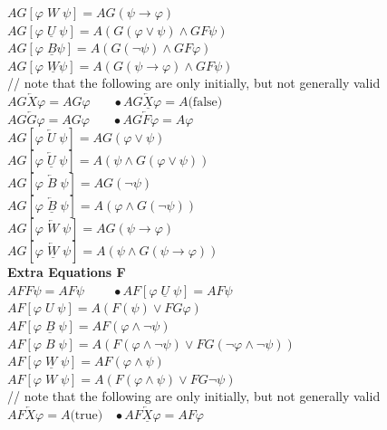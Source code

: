 \documentclass{article}
\begin{document}
\begin{multicols}{4}
$ AG[\varphi \; W \; \psi] = AG(\psi \rightarrow \varphi)$\\
$ AG[\varphi \; \underline{U} \; \psi]  =  A(G(\varphi \vee \psi)  \wedge G F \psi)$ \\
$AG[\varphi \; \underline{B} \psi] = A (G(\neg \psi)   \wedge G F \varphi )$\\
$AG[\varphi \; \underline{W} \psi] = A (G(\psi \rightarrow \varphi) \wedge G F \psi )$\\
// note that the following are only initially, but not generally valid\\
$AG \overleftarrow{X} \varphi = A G \varphi\ \ \ \ \ \ \ \ \bullet AG \underline{\overleftarrow{X}} \varphi = A \text{(false)}$\\
$AG \overleftarrow{G} \varphi = A G \varphi\ \ \ \ \ \ \ \ \bullet AG \overleftarrow{F} \varphi = A \varphi $\\
$AG[\varphi \; \overleftarrow{U}\; \psi] = A G(\varphi \vee \psi) $\\
$AG[\varphi \; \underline{\overleftarrow{U}}\;  \psi] = A (\psi \wedge G(\varphi \vee \psi))$\\
$AG[\varphi \; \overleftarrow{B}\; \psi] = A G(\neg \psi) $\\
$AG[\varphi \; \underline{\overleftarrow{B}}\;  \psi] = A (\varphi \wedge G(\neg \psi))$\\
$AG[\varphi \; \overleftarrow{W}\; \psi] = A G(\psi \rightarrow \varphi)$\\
$AG[\varphi \; \underline{\overleftarrow{W}}\;  \psi] = A (\psi \wedge G(\psi \rightarrow \varphi))$\\
\textbf{Extra Equations F}\\
$ A F F \psi = A F \psi\ \ \ \ \ \ \ \ \ \ \bullet A F[\varphi \; \underline{U}\; \psi]  = A F \psi $\\
$ A F[\varphi \; U\; \psi] = A (F(\psi) \vee  F G \varphi) $\\
$ A F[\varphi \; \underline{B}\; \psi]  = A F(\varphi \wedge \neg \psi) $\\
$ A F[\varphi \; B\; \psi] = A (F(\varphi \wedge \neg \psi)  \vee  F G (\neg \varphi \wedge \neg \psi) ) $\\
$ A F[\varphi \; \underline{W}\; \psi]  = A F(\varphi \wedge \psi)  $\\
$ A F[\varphi \; W\; \psi] = A (F(\varphi \wedge \psi) \vee  F G \neg \psi )$\\
// note that the following are only initially, but not generally valid\\
$ A F \overleftarrow{X} \varphi = A \text{(true)}\ \ \ \ \bullet A F \underline{\overleftarrow{X}} \varphi = A F \varphi $\\

\end{multicols}
\end{document}
